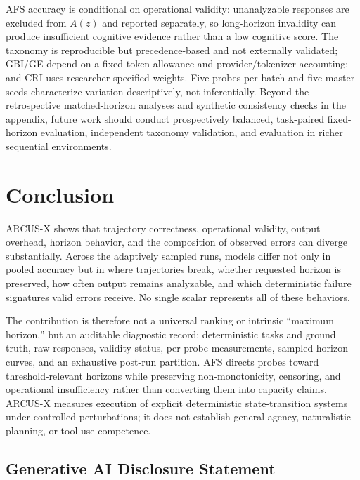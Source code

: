 \documentclass{article}
\begin{document}
AFS accuracy is conditional on operational validity: unanalyzable responses are excluded from $A(z)$ and reported separately, so long-horizon invalidity can produce insufficient cognitive evidence rather than a low cognitive score. The taxonomy is reproducible but precedence-based and not externally validated; GBI/GE depend on a fixed token allowance and provider/tokenizer accounting; and CRI uses researcher-specified weights. Five probes per batch and five master seeds characterize variation descriptively, not inferentially. Beyond the retrospective matched-horizon analyses and synthetic consistency checks in the appendix, future work should conduct prospectively balanced, task-paired fixed-horizon evaluation, independent taxonomy validation, and evaluation in richer sequential environments.
\section{Conclusion}


ARCUS-X shows that trajectory correctness, operational validity, output overhead, horizon behavior, and the composition of observed errors can diverge substantially. Across the adaptively sampled runs, models differ not only in pooled accuracy but in where trajectories break, whether requested horizon is preserved, how often output remains analyzable, and which deterministic failure signatures valid errors receive. No single scalar represents all of these behaviors.

The contribution is therefore not a universal ranking or intrinsic ``maximum horizon,'' but an auditable diagnostic record: deterministic tasks and ground truth, raw responses, validity status, per-probe measurements, sampled horizon curves, and an exhaustive post-run partition. AFS directs probes toward threshold-relevant horizons while preserving non-monotonicity, censoring, and operational insufficiency rather than converting them into capacity claims. ARCUS-X measures execution of explicit deterministic state-transition systems under controlled perturbations; it does not establish general agency, naturalistic planning, or tool-use competence.


\subsection*{Generative AI Disclosure Statement}
\end{document}
